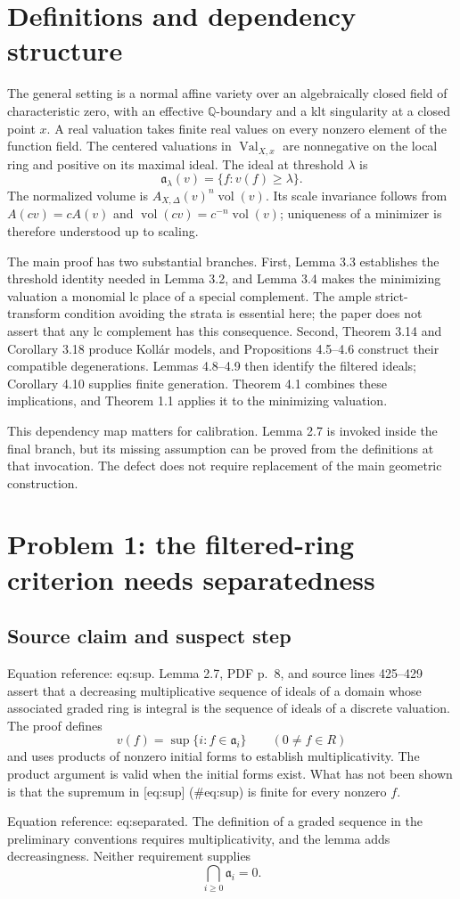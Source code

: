 \documentclass[10pt]{article}
\begin{document}
\section*{Definitions and dependency structure}
The general setting is a normal affine variety over an algebraically closed field of characteristic zero, with an effective \(\mathbb Q\)-boundary and a klt singularity at a closed point \(x\). A real valuation takes finite real values on every nonzero element of the function field. The centered valuations in \(\operatorname{Val}_{X,x}\) are nonnegative on the local ring and positive on its maximal ideal. The ideal at threshold \(\lambda\) is \[\mathfrak a_\lambda(v)=\{f:v(f)\geq\lambda\}.\] The normalized volume is \(A_{X,\Delta}(v)^n\operatorname{vol}(v)\). Its scale invariance follows from \(A(cv)=cA(v)\) and \(\operatorname{vol}(cv)=c^{-n}\operatorname{vol}(v)\); uniqueness of a minimizer is therefore understood up to scaling.\par
The main proof has two substantial branches. First, Lemma 3.3 establishes the threshold identity needed in Lemma 3.2, and Lemma 3.4 makes the minimizing valuation a monomial lc place of a special complement. The ample strict-transform condition avoiding the strata is essential here; the paper does not assert that any lc complement has this consequence. Second, Theorem 3.14 and Corollary 3.18 produce Kollár models, and Propositions 4.5–4.6 construct their compatible degenerations. Lemmas 4.8–4.9 then identify the filtered ideals; Corollary 4.10 supplies finite generation. Theorem 4.1 combines these implications, and Theorem 1.1 applies it to the minimizing valuation.\par
This dependency map matters for calibration. Lemma 2.7 is invoked inside the final branch, but its missing assumption can be proved from the definitions at that invocation. The defect does not require replacement of the main geometric construction.\par
\section*{Problem 1: the filtered-ring criterion needs separatedness}
\subsection*{Source claim and suspect step}
Equation reference: eq:sup. Lemma 2.7, PDF p. 8, and source lines 425–429 assert that a decreasing multiplicative sequence of ideals of a domain whose associated graded ring is integral is the sequence of ideals of a discrete valuation. The proof defines \[
 v(f)=\sup\{i:f\in\mathfrak a_i\}\qquad(0\ne f\in R)\] and uses products of nonzero initial forms to establish multiplicativity. The product argument is valid when the initial forms exist. What has not been shown is that the supremum in [eq:sup] (\#eq:sup) is finite for every nonzero \(f\).\par
Equation reference: eq:separated. The definition of a graded sequence in the preliminary conventions requires multiplicativity, and the lemma adds decreasingness. Neither requirement supplies \[
 \bigcap_{i\geq0}\mathfrak a_i=0.\]\par
\end{document}
